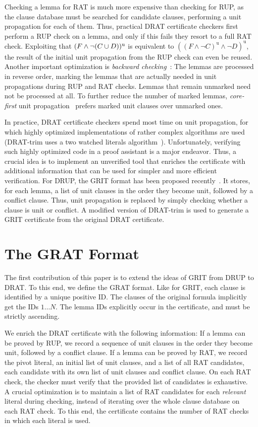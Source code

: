 \documentclass{llncs}
\begin{document}
Checking a lemma for RAT is much more expensive than checking for RUP, as the clause database must be searched for candidate clauses,
performing a unit propagation for each of them. Thus, practical DRAT certificate checkers first perform a RUP check on a lemma, and only if 
this fails they resort to a full RAT check. Exploiting that $(F\wedge\neg(C\cup D))^\textrm{u}$ is equivalent to $((F \wedge \neg C)^\textrm{u} \wedge \neg D)^\textrm{u}$,
the result of the initial unit propagation from the RUP check can even be reused.
Another important optimization is \emph{backward checking}~\cite{GoNo03,HHW13}: The lemmas are processed in reverse order, marking the lemmas that are actually needed 
in unit propagations during RUP and RAT checks. Lemmas that remain unmarked need not be processed at all. To further reduce the number of marked lemmas, 
\emph{core-first} unit propagation~\cite{WHH14} prefers marked unit clauses over unmarked ones.

In practice, DRAT certificate checkers spend most time on unit propagation, for which highly optimized implementations of rather complex algorithms 
are used (\eg DRAT-trim uses a two watched literals algorithm~\cite{MMZZ01}).
Unfortunately, verifying such highly optimized code in a proof assistant is a major endeavor.
Thus, a crucial idea is to implement an unverified tool that enriches the certificate with additional information that can be used for simpler and more efficient verification.
For DRUP, the GRIT format has been proposed recently~\cite{CMS16}. 
It stores, for each lemma, a list of unit clauses in the order they become unit, followed by a conflict clause.
Thus, unit propagation is replaced by 
simply checking whether a clause is unit or conflict. A modified version of DRAT-trim is used to generate a GRIT certificate from the original DRAT certificate.


\section{The GRAT Format}\label{sec:grat-format}
The first contribution of this paper is to extend the ideas of GRIT from DRUP to DRAT.
To this end, we define the GRAT format. 
Like for GRIT, each clause is identified by a unique positive ID. 
The clauses of the original formula implicitly get the IDs $1\ldots N$. The lemma IDs explicitly occur in the certificate, and must be strictly ascending.

We enrich the DRAT certificate with the following information: If a lemma can be proved by RUP, we record a sequence of unit clauses in the order they become unit, 
followed by a conflict clause. If a lemma can be proved by RAT, we record the pivot literal, an initial list of unit clauses, and a list of all 
RAT candidates, each candidate with its own list of unit clauses and conflict clause.
On each RAT check, the checker must verify that the provided list of candidates is exhaustive.
A crucial optimization is to maintain a list of RAT candidates for each \emph{relevant} literal during checking, instead of iterating 
over the whole clause database on each RAT check. To this end, the certificate contains the number of RAT checks in which each literal is used.
\end{document}
